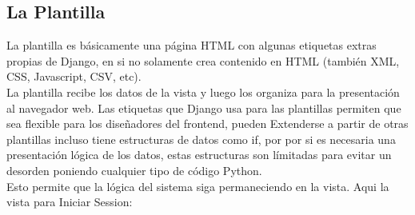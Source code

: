 \vspace{0.1cm}

\subsection{La Plantilla}
La plantilla es básicamente una página HTML con algunas etiquetas extras
propias de Django, en si no solamente crea contenido en HTML (también XML, CSS,
Javascript, CSV, etc).\\[0.1cm]

La plantilla recibe los datos de la vista y luego los organiza para la
presentación al navegador web. Las etiquetas que Django usa para las plantillas
permiten que sea flexible para los
diseñadores del frontend, pueden Extenderse a partir de otras plantillas incluso
tiene estructuras de datos como if, por por si es necesaria una presentación
lógica de los datos, estas estructuras
son límitadas para evitar un desorden poniendo cualquier tipo de código Python.\\[0.1cm]

Esto permite que la lógica del sistema siga permaneciendo en la vista. Aqui la
vista para Iniciar Session:\\[0.1cm]

